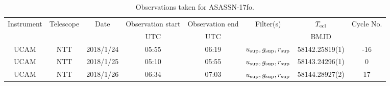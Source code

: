\begin{table}
	\begin{center}
		\caption{Observations taken for ASASSN-17fo.}
		\label{table:observing:observation logs ASASSN-17fo}
		\begin{tabular}{cccccccc}
			\hline
			Instrument & Telescope & Date & Observation start & Observation end & Filter(s) & $T_{\rm ecl}$ & Cycle No. \\
			 &  &  & UTC & UTC &  & BMJD &  \\
			\hline
			\hline
			UCAM & NTT & 2018/1/24 & 05:55 & 06:19 & $u_{\rm sup},g_{\rm sup},r_{\rm sup}$ & 58142.25819(1)                                                                                                            &                                         -16 \\
			UCAM & NTT & 2018/1/25 & 05:10 & 05:55 & $u_{\rm sup},g_{\rm sup},r_{\rm sup}$ & 58143.24296(1)                                                                                                            &                                           0 \\
			UCAM & NTT & 2018/1/26 & 06:34 & 07:03 & $u_{\rm sup},g_{\rm sup},r_{\rm sup}$ & 58144.28927(2)                                                                                                            &                                          17 \\
		   \hline
		\end{tabular}
	\end{center}
\end{table}